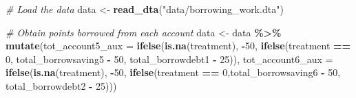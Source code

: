\documentclass[
]{article}
\newenvironment{Shaded}{\begin{snugshade}}{\end{snugshade}}
\newcommand{\AttributeTok}[1]{\textcolor[rgb]{0.13,0.29,0.53}{#1}}
\newcommand{\CommentTok}[1]{\textcolor[rgb]{0.56,0.35,0.01}{\textit{#1}}}
\newcommand{\DecValTok}[1]{\textcolor[rgb]{0.00,0.00,0.81}{#1}}
\newcommand{\FunctionTok}[1]{\textcolor[rgb]{0.13,0.29,0.53}{\textbf{#1}}}
\newcommand{\NormalTok}[1]{#1}
\newcommand{\OtherTok}[1]{\textcolor[rgb]{0.56,0.35,0.01}{#1}}
\newcommand{\SpecialCharTok}[1]{\textcolor[rgb]{0.81,0.36,0.00}{\textbf{#1}}}
\newcommand{\StringTok}[1]{\textcolor[rgb]{0.31,0.60,0.02}{#1}}
\begin{document}
\begin{Shaded}
\begin{Highlighting}[]
\CommentTok{\# Load the data}
\NormalTok{data }\OtherTok{\textless{}{-}} \FunctionTok{read\_dta}\NormalTok{(}\StringTok{"data/borrowing\_work.dta"}\NormalTok{)}

\CommentTok{\# Obtain points borrowed from each account}
\NormalTok{data }\OtherTok{\textless{}{-}}\NormalTok{ data }\SpecialCharTok{\%\textgreater{}\%}
  \FunctionTok{mutate}\NormalTok{(}\AttributeTok{tot\_account5\_aux =} \FunctionTok{ifelse}\NormalTok{(}\FunctionTok{is.na}\NormalTok{(treatment), }\SpecialCharTok{{-}}\DecValTok{50}\NormalTok{, }\FunctionTok{ifelse}\NormalTok{(treatment }\SpecialCharTok{==} \DecValTok{0}\NormalTok{, total\_borrowsaving5 }\SpecialCharTok{{-}} \DecValTok{50}\NormalTok{, total\_borrowdebt1 }\SpecialCharTok{{-}} \DecValTok{25}\NormalTok{)),}
         \AttributeTok{tot\_account6\_aux =} \FunctionTok{ifelse}\NormalTok{(}\FunctionTok{is.na}\NormalTok{(treatment), }\SpecialCharTok{{-}}\DecValTok{50}\NormalTok{, }\FunctionTok{ifelse}\NormalTok{(treatment }\SpecialCharTok{==} \DecValTok{0}\NormalTok{,total\_borrowsaving6 }\SpecialCharTok{{-}} \DecValTok{50}\NormalTok{, total\_borrowdebt2 }\SpecialCharTok{{-}} \DecValTok{25}\NormalTok{)))}


\end{Highlighting}
\end{Shaded}
\end{document}
